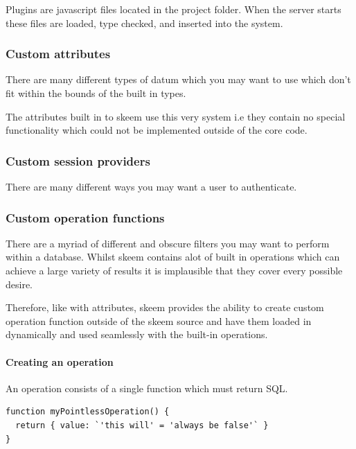 \documentclass[
  12pt,
]{article}
\let\oldparagraph\paragraph
\renewcommand{\paragraph}[1]{\oldparagraph{#1}\mbox{}}
\begin{document}
Plugins are javascript files located in the project folder. When the
server starts these files are loaded, type checked, and inserted into
the system.

\hypertarget{custom-attributes}{%
\subsubsection{Custom attributes}\label{custom-attributes}}

There are many different types of datum which you may want to use which
don't fit within the bounds of the built in types.

The attributes built in to skeem use this very system i.e they contain
no special functionality which could not be implemented outside of the
core code.

\hypertarget{custom-session-providers}{%
\subsubsection{Custom session
providers}\label{custom-session-providers}}

There are many different ways you may want a user to authenticate.

\hypertarget{custom-operation-functions}{%
\subsubsection{Custom operation
functions}\label{custom-operation-functions}}

There are a myriad of different and obscure filters you may want to
perform within a database. Whilst skeem contains alot of built in
operations which can achieve a large variety of results it is
implausible that they cover every possible desire.

Therefore, like with attributes, skeem provides the ability to create
custom operation function outside of the skeem source and have them
loaded in dynamically and used seamlessly with the built-in operations.

\hypertarget{creating-an-operation}{%
\paragraph{Creating an operation}\label{creating-an-operation}}

An operation consists of a single function which must return SQL.

\begin{lstlisting}[caption={The simplist custom operation - it would always return false and so is utterly pointless.}]
function myPointlessOperation() {
  return { value: `'this will' = 'always be false'` }
}
\end{lstlisting}
\end{document}
